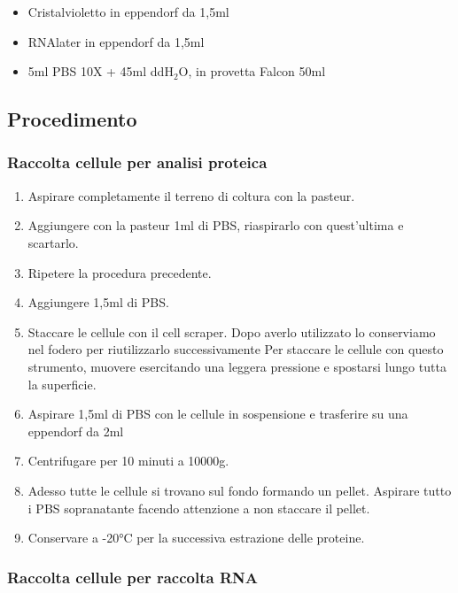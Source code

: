 \begin{itemize}
\item Cristalvioletto in eppendorf da 1,5ml
\item RNAlater in eppendorf da 1,5ml
\item 5ml PBS 10X + 45ml ddH$_2$O, in provetta Falcon 50ml
\end{itemize}

\subsection{Procedimento}

\subsubsection{Raccolta cellule per analisi proteica}

\begin{enumerate}

\item Aspirare completamente il terreno di coltura con la pasteur.
\item Aggiungere con la pasteur 1ml di PBS, riaspirarlo con quest'ultima e scartarlo.
\item Ripetere la procedura precedente.
\item Aggiungere 1,5ml di PBS.
\item Staccare le cellule con il cell scraper.
Dopo averlo utilizzato lo conserviamo nel fodero per riutilizzarlo successivamente
Per staccare le cellule con questo strumento, muovere esercitando una leggera pressione
e spostarsi lungo tutta la superficie.
\item Aspirare 1,5ml di PBS con le cellule in sospensione e trasferire su una eppendorf da 2ml
\item Centrifugare per 10 minuti a 10000g.
\item Adesso tutte le cellule si trovano sul fondo formando un pellet. Aspirare tutto
i PBS sopranatante facendo attenzione a non staccare il pellet.
\item Conservare a -20°C per la successiva estrazione delle proteine.

\end{enumerate}

\subsubsection{Raccolta cellule per raccolta RNA}

